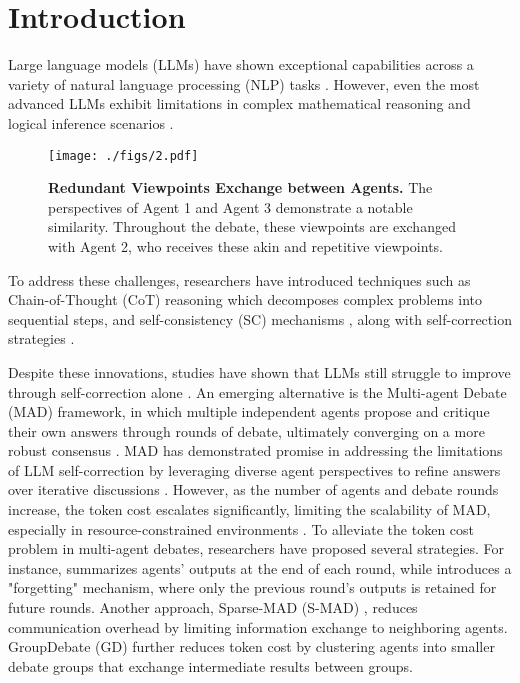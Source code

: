 \section{Introduction}
\label{sec:introduction}
Large language models (LLMs) have shown exceptional capabilities across a variety of natural language processing (NLP) tasks \citep{openai2024gpt4,brown2020language,bubeck2023sparks,radford2018improving,radford2019language,touvron2023llama,touvron2023llama2,anil2023palm,chowdhery2023palm}. 
%
However, even the most advanced LLMs exhibit limitations in complex mathematical reasoning and logical inference scenarios \citep{liu2023evaluating}. 
%

 \begin{figure*}[t]
    \centering
    \texttt{[image: ./figs/2.pdf]}
     \caption{\textbf{Redundant Viewpoints Exchange between Agents.} The perspectives of Agent 1 and Agent 3 demonstrate a notable similarity. Throughout the debate, these viewpoints are exchanged with Agent 2, who receives these akin and repetitive viewpoints.
 }
     \label{fig:examples}
     \vspace{-1.0 em}
 \end{figure*}
 
To address these challenges, researchers have introduced techniques such as Chain-of-Thought (CoT) reasoning \citep{wei2023chainofthought} which decomposes complex problems into sequential steps, and self-consistency (SC) mechanisms \citep{wang2023selfconsistency}, along with self-correction strategies \citep{welleck2022generating,madaan2024self,shinn2024reflexion}. 

%
Despite these innovations, studies have shown that LLMs still struggle to improve through self-correction alone \citep{huang2023large, valmeekam2023can, stechly2023gpt}.
%
An emerging alternative is the Multi-agent Debate (MAD) framework, in which multiple independent agents propose and critique their own answers through rounds of debate, ultimately converging on a more robust consensus \citep{sun2023corex}. 
%
MAD has demonstrated promise in addressing the limitations of LLM self-correction by leveraging diverse agent perspectives to refine answers over iterative discussions \citep{chan2023chateval,du2023improving,liang2023encouraging}. 
%
However, as the number of agents and debate rounds increase, the token cost escalates significantly, limiting the scalability of MAD, especially in resource-constrained environments \citep{li2024improving,liu2024GroupDebate}.
%
To alleviate the token cost problem in multi-agent debates, researchers have proposed several strategies. 
%
For instance, \citep{du2023improving} summarizes agents' outputs at the end of each round, while \citep{sun2023corex} introduces a "forgetting" mechanism, where only the previous round’s outputs is retained for future rounds. 
Another approach, Sparse-MAD (S-MAD) \citep{li2024improving}, reduces communication overhead by limiting information exchange to neighboring agents. 
GroupDebate (GD) \citep{liu2024GroupDebate} further reduces token cost by clustering agents into smaller debate groups that exchange intermediate results between groups.

